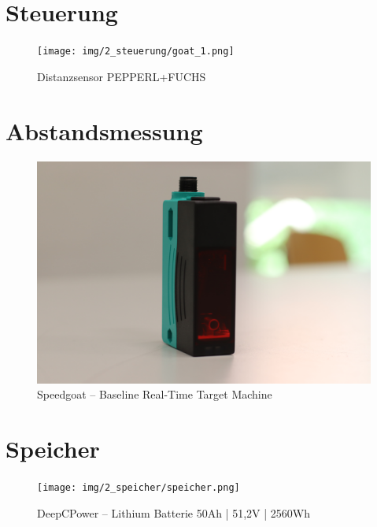 \section{Steuerung}

\begin{figure}[ht]
	\begin{center}
		\texttt{[image: img/2\_steuerung/goat\_1.png]}
		\caption{Distanzsensor PEPPERL+FUCHS }
		\label{img_2_2:steuerung_goat:1}
	\end{center}
\end{figure}


\section{Abstandsmessung}

\begin{figure}[ht]
	\begin{center}
		\includegraphics[width=\textwidth]{img/2_sen/dis_1.png}
		\caption{Speedgoat – Baseline Real-Time Target Machine}
		\label{img_2_2:sen_dis:1}
	\end{center}
\end{figure}




\section{Speicher}

\begin{figure}[!ht]
	\begin{center}
		\texttt{[image: img/2\_speicher/speicher.png]}
		\caption{DeepCPower – Lithium Batterie 50Ah | 51,2V | 2560Wh}
		\label{img_2_2:speicher_1:1}
	\end{center}
\end{figure}


